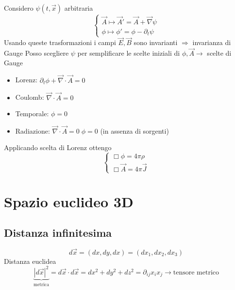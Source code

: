 Considero $\psi(t, \vec{x})$ arbitraria
\begin{equation*}
    \begin{cases}
        \vec{A} \mapsto \vec{A}' = \vec{A} + \vec{\nabla}\psi \\
        \phi \mapsto \phi' = \phi - \partial_t \psi 
    \end{cases}
\end{equation*}
Usando queste trasformazioni i campi $\vec{E}, \vec{B}$ sono invarianti $\Rightarrow$ invarianza di Gauge \newline
Posso scegliere $\psi$ per semplificare le scelte iniziali di $\phi,\vec{A} \rightarrow$ scelte di Gauge
\begin{itemize}
    \item Lorenz: $\partial_t \phi + \vec{\nabla} \cdot \vec{A} = 0$
    \item Coulomb: $\vec{\nabla} \cdot \vec{A} = 0$
    \item Temporale: $\phi = 0$
    \item Radiazione: $\vec{\nabla} \cdot \vec{A} = 0 \; \phi = 0$ (in assenza di sorgenti)
\end{itemize}
Applicando scelta di Lorenz ottengo
\begin{equation*}
    \begin{cases}
        \Box \phi = 4 \pi \rho \\
        \Box \vec{A} = 4 \pi \vec{J}
    \end{cases}
\end{equation*}

\section{Spazio euclideo 3D}

\subsection*{Distanza infinitesima}
\begin{equation*}
    d\vec{x} = (dx,dy,dx) = (dx_1,dx_2,dx_3)
\end{equation*}
Distanza euclidea
\begin{equation*}
    \underbrace{{|d\vec{x}|}^2}_{\text{metrica}} = d\vec{x} \cdot d\vec{x} = dx^2 + dy^2 + dz^2 = \partial_{ij}x_ix_j \rightarrow \text{tensore metrico}
\end{equation*}

